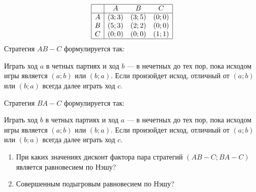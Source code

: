 \begin{problem}

\[\begin{array}{|c|ccc|}  \hline {} & {A} & {B} & {C} \\  \hline {A} & {\left(3;3\right)} & {\left(3;5\right)} & {\left(0;0\right)} \\ {B} & {\left(5;3\right)} & {\left(2;2\right)} & {\left(0;0\right)} \\ {C} & {\left(0;0\right)} & {\left(0;0\right)} & {\left(1;1\right)} \\  \hline  \end{array}\]
Стратегия  $AB-C$  формулируется так:\par
Играть ход  $a$  в четных партиях и ход  $b$  --- в нечетных до тех пор, пока исходом игры является  $\left(a;b\right)$  или  $\left(b;a\right)$. Если произойдет исход, отличный от  $\left(a;b\right)$  или  $\left(b;a\right)$  всегда далее играть ход  $c$.\par
Стратегия  $BA-C$  формулируется так:\par
Играть ход  $b$  в четных партиях и ход  $a$  --- в нечетных до тех пор, пока исходом игры является  $\left(a;b\right)$  или  $\left(b;a\right)$. Если произойдет исход, отличный от  $\left(a;b\right)$  или  $\left(b;a\right)$  всегда далее играть ход  $c$.\par
\begin{enumerate}
\item При каких значениях дисконт фактора пара стратегий  $\left(AB-C;BA-C\right)$  является равновесием по Нэшу?\par
\item Совершенным подыгровым равновесием по Нэшу?
\end{enumerate}


\begin{sol}

\end{sol}
\end{problem}



